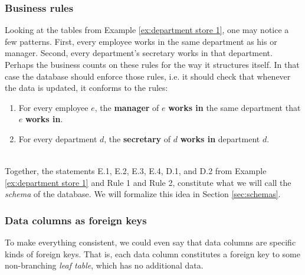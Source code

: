 \documentclass{book}
\def\hsp{\hspace{.3in}}
\theoremstyle{remark}
\theoremstyle{definition}
\begin{document}

\subsubsection{Business rules}

Looking at the tables from Example \ref{ex:department store 1}, one may notice a few patterns. First, every employee works in the same department as his or manager. Second, every department's secretary works in that department. Perhaps the business counts on these rules for the way it structures itself. In that case the database should enforce those rules, i.e. it should check that whenever the data is updated, it conforms to the rules: 

\begin{enumerate}[\hsp Rule 1\;]
\item For every employee $e$, the {\bf manager} of $e$ {\bf works in} the same department that $e$ {\bf works in}.
\item For every department $d$, the {\bf secretary} of $d$ {\bf works in} department $d$.
\end{enumerate}
\vspace{-.3in}\begin{align}\label{dia:rules}\end{align}\vspace{-.3in}

Together, the statements E.1, E.2, E.3, E.4, D.1, and D.2 from Example \ref{ex:department store 1} and Rule 1 and Rule 2, constitute what we will call the {\em schema} of the database. We will formalize this idea in Section \ref{sec:schemas}.


\subsubsection{Data columns as foreign keys}

To make everything consistent, we could even say that data columns are specific kinds of foreign keys. That is, each data column constitutes a foreign key to some non-branching {\em leaf table}, which has no additional data. 
\end{document}
